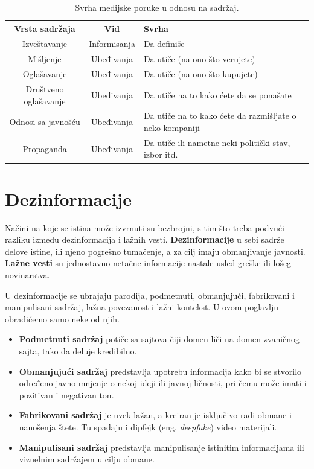 \documentclass[a4paper]{article}
\begin{document}
\begin{table}[ht!]
\begin{center}
\begin{tabular}{|c|c|p{3cm} |} \hline
Vrsta sadržaja& Vid& Svrha\\ \hline
Izveštavanje&Informisanja&Da definiše\\ \hline
Mišljenje &Ubeđivanja&Da utiče (na ono što verujete)\\ \hline
Oglašavanje &Ubeđivanja&Da utiče (na ono što kupujete)\\ \hline
Društveno oglašavanje &Ubeđivanja&Da utiče na to kako ćete da se ponašate\\ \hline
Odnosi sa javnošću &Ubeđivanja&Da utiče na to kako ćete da razmišljate o neko kompaniji\\ \hline
Propaganda &Ubeđivanja&Da utiče ili nametne neki politički stav, izbor itd.\\ \hline
\end{tabular}
\caption{ Svrha medijske poruke u odnosu na sadržaj.}
\label{tab:tabela1}
\end{center}
\end{table}

\newpage
\section{Dezinformacije}
\label{sec:naslov3}

Načini na koje se istina može izvrnuti su bezbrojni, s tim što treba podvući razliku između dezinformacija i lažnih vesti. \newline \textbf{Dezinformacije} u sebi sadrže delove istine, ili njeno pogrešno tumačenje, a za cilj imaju obmanjivanje javnosti. \newline \textbf{Lažne vesti} su jednostavno netačne informacije nastale usled greške ili lošeg novinarstva.    


U dezinformacije se ubrajaju parodija, podmetnuti, obmanjujući, fabrikovani i manipulisani sadržaj, lažna povezanost i lažni kontekst. U ovom poglavlju obradićemo samo neke od njih.


\begin{itemize}
    \item \textbf{Podmetnuti sadržaj} potiče sa sajtova čiji domen liči na domen zvaničnog sajta, tako da deluje kredibilno.
    \item \textbf{Obmanjujući sadržaj} predstavlja upotrebu informacija kako bi se stvorilo određeno javno mnjenje o nekoj ideji ili javnoj ličnosti, pri čemu može imati i pozitivan i negativan ton.
    \item \textbf{Fabrikovani sadržaj} je uvek lažan, a kreiran je isključivo radi obmane i nanošenja štete. Tu spadaju i dipfejk \cite{deepfake} (eng. \emph{deepfake}) video materijali.
    \item \textbf{Manipulisani sadržaj} predstavlja manipulisanje istinitim informacijama ili vizuelnim sadržajem u cilju obmane.
\end{itemize}
\end{document}

